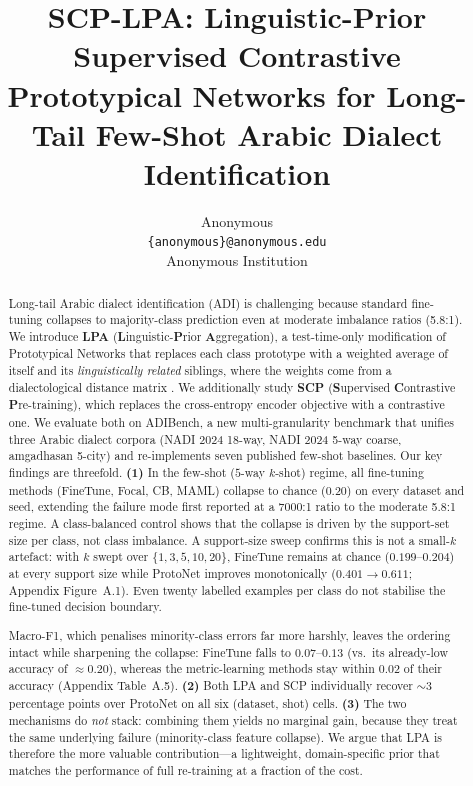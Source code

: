 \documentclass[11pt]{article}
\title{SCP-LPA: Linguistic-Prior Supervised Contrastive Prototypical
Networks for Long-Tail Few-Shot Arabic Dialect Identification}
\author{Anonymous \\
  \texttt{\{anonymous\}@anonymous.edu} \\
  Anonymous Institution}
\date{}
\newcommand{\bench}{ADIBench}
\begin{document}
\maketitle

\begin{abstract}
Long-tail Arabic dialect identification (ADI) is challenging
because standard fine-tuning collapses to majority-class
prediction even at moderate imbalance ratios (5.8:1). We
introduce \textbf{LPA} (\textbf{L}inguistic-\textbf{P}rior
\textbf{A}ggregation), a test-time-only modification of
Prototypical Networks that replaces each class prototype with
a weighted average of itself and its \emph{linguistically
related} siblings, where the weights come from a
dialectological distance matrix \citep{Versteegh2006,
Habash2010}. We additionally study \textbf{SCP} (\textbf{S}upervised
\textbf{C}ontrastive \textbf{P}re-training), which replaces the
cross-entropy encoder objective with a contrastive one. We
evaluate both on \bench{}, a new multi-granularity benchmark
that unifies three Arabic dialect corpora (NADI 2024 18-way,
NADI 2024 5-way coarse, amgadhasan 5-city) and re-implements
seven published few-shot baselines. Our key findings are
threefold. \textbf{(1)} In the few-shot ($5$-way $k$-shot) regime,
all fine-tuning methods (FineTune, Focal, CB, MAML) collapse to
chance (0.20) on every dataset and seed,
extending the failure mode first reported at a 7000:1 ratio
\citep{DACD2024} to the moderate 5.8:1 regime. A class-balanced control shows that the collapse is driven by the
support-set size per class, not class imbalance.
 A support-size sweep confirms this is not a small-$k$ artefact:
 with $k$ swept over $\{1,3,5,10,20\}$, FineTune remains at chance
 ($0.199$--$0.204$) at every support size while ProtoNet improves
 monotonically ($0.401{\rightarrow}0.611$; Appendix Figure~A.1).
 Even twenty labelled examples per class do not stabilise the
 fine-tuned decision boundary.

 Macro-F1, which penalises minority-class errors far more harshly,
 leaves the ordering intact while sharpening the collapse:
 FineTune falls to $0.07$--$0.13$ (vs.\ its already-low accuracy
 of ${\approx}0.20$), whereas the metric-learning methods stay
 within $0.02$ of their accuracy (Appendix Table~A.5). \textbf{(2)}
Both LPA and SCP individually recover $\sim$3 percentage points
over ProtoNet on all six (dataset, shot) cells. \textbf{(3)}
The two mechanisms do \emph{not} stack: combining them yields
no marginal gain, because they treat the same underlying
failure (minority-class feature collapse). We argue that LPA is
therefore the more valuable contribution---a lightweight,
domain-specific prior that matches the performance of full
re-training at a fraction of the cost.
\end{abstract}
\end{document}

